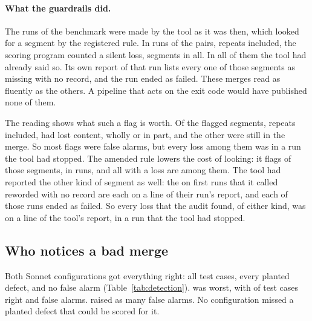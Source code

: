 \paragraph{What the guardrails did.} The runs of the benchmark were made by the tool as it was then, which looked for a segment by the registered rule. In  runs of the pairs, repeats included, the scoring program counted a silent loss,  segments in all. In all  of them the tool had already said so. Its own report of that run lists every one of those segments as missing with no record, and the run ended as failed. These merges read as fluently as the others. A pipeline that acts on the exit code would have published none of them.

The reading shows what such a flag is worth. Of the  flagged segments, repeats included,  had lost content, wholly or in part, and the other  were still in the merge. So most flags were false alarms, but every loss among them was in a run the tool had stopped. The amended rule lowers the cost of looking: it flags  of those segments, in  runs, and all  with a loss are among them. The tool had reported the other kind of segment as well: the  on first runs that it called reworded with no record are each on a line of their run's report, and each of those runs ended as failed. So every loss that the audit found, of either kind, was on a line of the tool's report, in a run that the tool had stopped.

\subsection{Who notices a bad merge}
\label{sec:detection}

Both Sonnet configurations got everything right: all  test cases, every planted defect, and no false alarm (Table~\ref{tab:detection}). \texttt{} was worst, with  of  test cases right and  false alarms. \texttt{} raised as many false alarms. No configuration missed a planted defect that could be scored for it.

